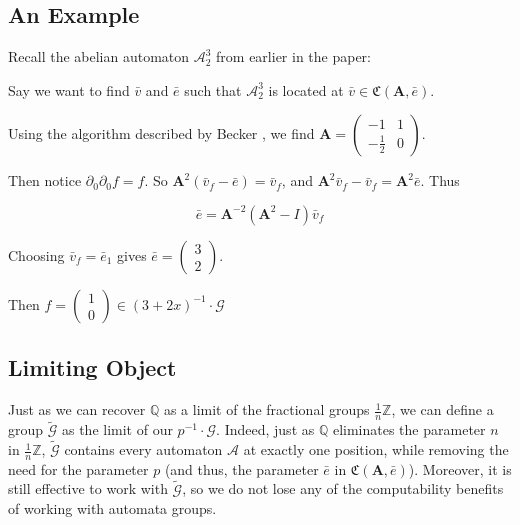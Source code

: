 \documentclass[final]{ws-ijac}
\newcommand{\A}{\mathcal{A}}
\newcommand{\G}{\mathcal{G}}
\newcommand{\C}{\mathfrak{C}(\Am,\e)}
\newcommand{\Z}{\mathbb{Z}}
\newcommand{\Q}{\mathbb{Q}}
\newcommand{\2}{\textbf{2}}
\newcommand{\Am}{\textbf{A}}
\newcommand{\del}{\partial}
\newcommand{\vv}{\bar{v}}
\newcommand{\e}{\bar{e}}
\begin{document}
\subsection{An Example}
Recall the abelian automaton $\A^3_2$ from earlier in the paper:

\begin{center}
\end{center}

Say we want to find $\vv$ and $\e$ such that $\A^3_2$ is located at 
$\vv \in \C$.

Using the algorithm described by Becker \cite{Becker18:thesis}, we find
$\Am = \begin{pmatrix} -1 & 1 \\ -\frac{1}{2} & 0 \end{pmatrix}$.

Then notice $\del_0 \del_0 f = f$.
So $\Am^2 (\vv_f - \e) = \vv_f$, and
$\Am^2 \vv_f - \vv_f = \Am^2 \e$. Thus

\[ \e = \Am^{-2} (\Am^2 - I) \vv_f \]

Choosing $\vv_f = \e_1$ gives $\e = \begin{pmatrix} 3 \\ 2 \end{pmatrix}$.

Then $f = \begin{pmatrix} 1 \\ 0 \end{pmatrix} \in (3+2x)^{-1} \cdot \G$

\subsection{Limiting Object}
Just as we can recover $\Q$ as a limit of the fractional groups 
$\frac{1}{n} \Z$, we can define a group $\widetilde{\G}$ as the limit of
our $p^{-1} \cdot \G$. Indeed, just as
$\Q$ eliminates the parameter $n$ in $\frac{1}{n} \Z$, $\widetilde{\G}$ 
contains every automaton $\A$ at exactly one position, while removing the need
for the parameter $p$ (and thus, the parameter $\e$ in $\C$). Moreover, it is
still effective to work with $\widetilde{\G}$, so we do not lose any of the
computability benefits of working with automata groups.
\end{document}
